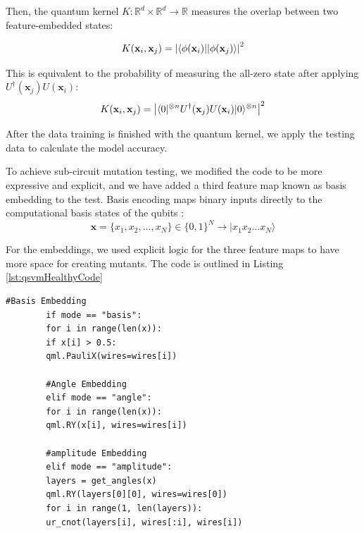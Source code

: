 \documentclass[12pt,a4paper]{article}
\DeclarePairedDelimiter\bra{\langle}{\rvert}
\DeclarePairedDelimiter\ket{\lvert}{\rangle}
\begin{document}
	Then, the quantum kernel $K: \mathbb{R}^d \times \mathbb{R}^d \to \mathbb{R}$ measures the overlap between two feature-embedded states:
	
	\begin{equation}
		K(\mathbf{x}_i, \mathbf{x}_j) = \left| \bra{\phi(\mathbf{x}_i)} \ket{\phi(\mathbf{x}_j)} \right|^2
	\end{equation}
	
	This is equivalent to the probability of measuring the all-zero state after applying $U^\dagger(\mathbf{x}_j)U(\mathbf{x}_i)$:
	\begin{equation}
		K(\mathbf{x}_i, \mathbf{x}_j) = \left| \bra{0}^{\otimes n} U^\dagger(\mathbf{x}_j) U(\mathbf{x}_i) \ket{0}^{\otimes n} \right|^2
	\end{equation}
	
	
	After the data training is finished with the quantum kernel, we apply the testing data to calculate the model accuracy.
	
	To achieve sub-circuit mutation testing, we modified the code to be more expressive and explicit, and we have added a third feature map known as basis embedding to the test. Basis encoding maps binary inputs directly to the computational basis states of the qubits \cite{schuld2018}:
	$$ \mathbf{x} = \{x_1, x_2, \dots, x_N\} \in \{0,1\}^N \rightarrow |x_1 x_2 \dots x_N\rangle $$
	
	For the embeddings, we used explicit logic for the three feature maps to have more space for creating mutants. The code is outlined in Listing \ref{lst:qsvmHealthyCode}
	
	\begin{lstlisting}[caption=Standard QSVM Script (Explicit Embedding Logic), label={lst:qsvmHealthyCode}]
		#Basis Embedding
		if mode == "basis":
		for i in range(len(x)):
		if x[i] > 0.5: 
		qml.PauliX(wires=wires[i])
		
		#Angle Embedding
		elif mode == "angle":
		for i in range(len(x)):
		qml.RY(x[i], wires=wires[i])
		
		#amplitude Embedding		
		elif mode == "amplitude":
		layers = get_angles(x)
		qml.RY(layers[0][0], wires=wires[0])
		for i in range(1, len(layers)): 
		ur_cnot(layers[i], wires[:i], wires[i])
	\end{lstlisting}
	
\end{document}
